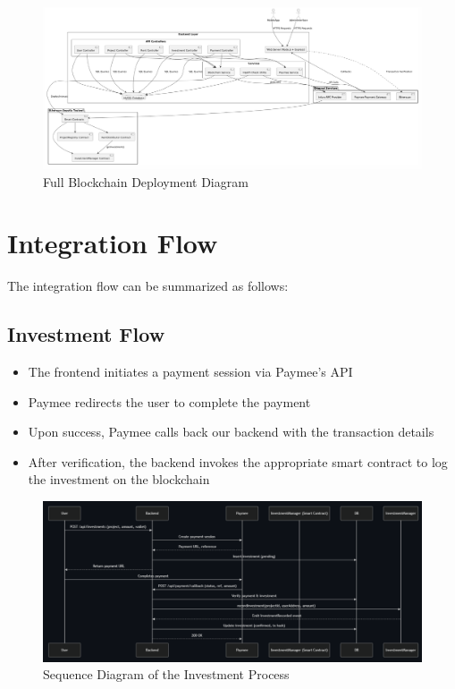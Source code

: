 \newpage
\begin{figure}[htbp]
  \centering
  \includegraphics[width=\textwidth]{images/blockchain_deployment_diagram.png}
  \caption{Full Blockchain Deployment Diagram}
  \label{fig:blockchain-deployment}
\end{figure}

\section{Integration Flow}

The integration flow can be summarized as follows:

\subsection{Investment Flow}

\begin{itemize}
    \item The frontend initiates a payment session via Paymee's API
    \item Paymee redirects the user to complete the payment
    \item Upon success, Paymee calls back our backend with the transaction details
    \item After verification, the backend invokes the appropriate smart contract to log the investment on the blockchain
\end{itemize}

\begin{figure}[htbp]
  \centering
  \includegraphics[width=\textwidth]{images/investment_sequence.png}
  \caption{Sequence Diagram of the Investment Process}
  \label{fig:investment-sequence}
\end{figure}

